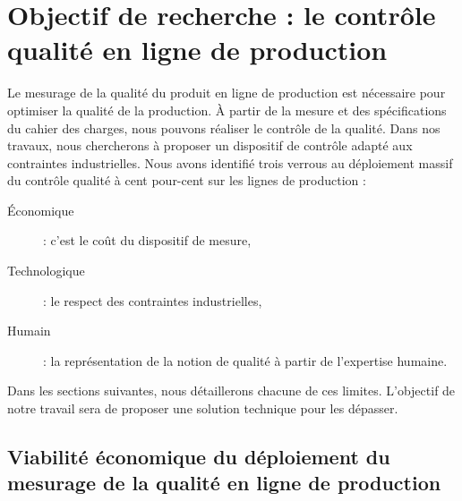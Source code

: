\section{Objectif de recherche : le contrôle qualité en ligne de production} \label{sec:research_objectives}
Le mesurage de la qualité du produit en ligne de production est nécessaire pour optimiser la qualité de la production.
À partir de la mesure et des spécifications du cahier des charges, nous pouvons réaliser le contrôle de la qualité.
Dans nos travaux, nous chercherons à proposer un dispositif de contrôle adapté aux contraintes industrielles.
Nous avons identifié trois verrous au déploiement massif du contrôle qualité à cent pour-cent sur les lignes de production :
\begin{description}
	\item[Économique] : c’est le coût du dispositif de mesure,
	\item[Technologique] : le respect des contraintes industrielles,
	\item[Humain] : la représentation de la notion de qualité à partir de l'expertise humaine.
\end{description}
Dans les sections suivantes, nous détaillerons chacune de ces limites.
L'objectif de notre travail sera de proposer une solution technique pour les dépasser.

\subsection{Viabilité économique du déploiement du mesurage de la qualité en ligne de production}

